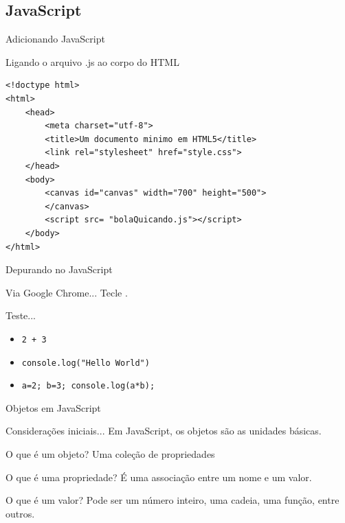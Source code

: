 \documentclass[xcolor=dvipsnames,table]{beamer}
\begin{document}
\subsection{JavaScript}
\begin{frame}[fragile]{Adicionando JavaScript}
	\begin{block}{Ligando o arquivo .js ao corpo do HTML}
		\begin{lstlisting}
<!doctype html>
<html>
	<head>
		<meta charset="utf-8">
		<title>Um documento minimo em HTML5</title>
		<link rel="stylesheet" href="style.css">
	</head>
	<body>
		<canvas id="canvas" width="700" height="500">
		</canvas>
		<script src= "bolaQuicando.js"></script>
	</body>
</html>
\end{lstlisting}
		\end{block}
\end{frame}

\begin{frame}{Depurando no JavaScript}
	\begin{block}{Via Google Chrome...}
		Tecle .
	\end{block} 
	\begin{block}{Teste...}
		\begin{itemize}
			\item {\tt 2 + 3}
			\item {\tt console.log("Hello World")}
			\item {\tt a=2; b=3; console.log(a*b);}
		\end{itemize}
	\end{block}
\end{frame}

\begin{frame}{Objetos em JavaScript}
	\begin{block}{Considerações iniciais...}
		Em JavaScript, os objetos são as unidades básicas.
	\end{block} 
	\begin{block}{O que é um objeto?}
		Uma coleção de propriedades	
	\end{block} 
	\begin{block}{O que é uma propriedade?}
		É uma associação entre um nome e um valor.
	\end{block}
	\begin{block}{O que é um valor?}
		Pode ser um número inteiro, uma cadeia, uma função, entre outros.
	\end{block}
\end{frame}
\end{document}
